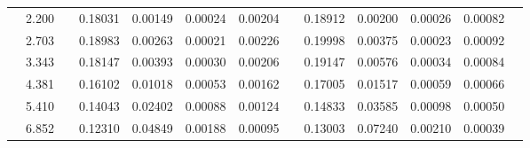 \documentclass[aps,prc,superscriptaddress,showpacs,floatfix,twocolumn]{revtex4}
\begin{document}
\begin{table}[htbp]
\begin{ruledtabular}
\begin{tabular}{c|cccccccccccc}
 & 2.200 && 0.18031 & 0.00149 & 0.00024 & 0.00204 & & 0.18912 & 0.00200 & 0.00026 & 0.00082 \\ 
 & 2.703 && 0.18983 & 0.00263 & 0.00021 & 0.00226 & & 0.19998 & 0.00375 & 0.00023 & 0.00092 \\ 
 & 3.343 && 0.18147 & 0.00393 & 0.00030 & 0.00206 & & 0.19147 & 0.00576 & 0.00034 & 0.00084 \\ 
 & 4.381 && 0.16102 & 0.01018 & 0.00053 & 0.00162 & & 0.17005 & 0.01517 & 0.00059 & 0.00066 \\ 
 & 5.410 && 0.14043 & 0.02402 & 0.00088 & 0.00124 & & 0.14833 & 0.03585 & 0.00098 & 0.00050 \\ 
 & 6.852 && 0.12310 & 0.04849 & 0.00188 & 0.00095 & & 0.13003 & 0.07240 & 0.00210 & 0.00039 \\ 
\end{tabular} \end{ruledtabular} \endgroup
\end{table}
\end{document}
